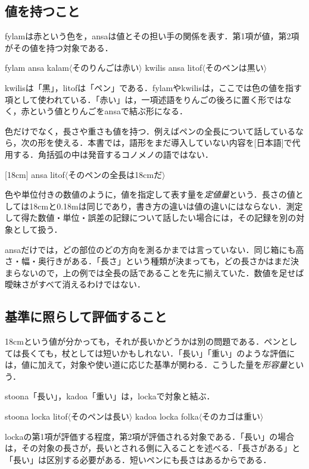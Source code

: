 \documentclass[b5paper, 10pt]{ltjsarticle}
\newcommand{\ko}[1]{\textsf{#1}}
\newcommand{\sentence}[1]{$\langle$#1$\rangle$}
\newcommand{\kox}[1]{\textsf{[#1]}}
\begin{document}
\subsection{値を持つこと}
\ko{fylam}は赤という色を，\ko{ansa}は値とその担い手の関係を表す．第1項が値，第2項がその値を持つ対象である．
\begin{exe}
    \ex \ko{fylam ansa kalam}\hfill \sentence{そのりんごは赤い}
    \ex \ko{kwilis ansa litof}\hfill \sentence{そのペンは黒い}
\end{exe}
\ko{kwilis}は「黒」，\ko{litof}は「ペン」である．\ko{fylam}や\ko{kwilis}は，ここでは色の値を指す項として使われている．「赤い」は，一項述語をりんごの後ろに置く形ではなく，赤という値とりんごを\ko{ansa}で結ぶ形になる．

色だけでなく，長さや重さも値を持つ．例えばペンの全長について話しているなら，次の形を使える．本書では，語形をまだ導入していない内容を\kox{日本語}で代用する．角括弧の中は発音するコノメノの語ではない．
\begin{exe}
    \ex \kox{18cm} \ko{ansa litof}\hfill \sentence{そのペンの全長は18cmだ}
\end{exe}
色や単位付きの数値のように，値を指定して表す量を\emph{定値量}という．長さの値としては18cmと0.18mは同じであり，書き方の違いは値の違いにはならない．測定して得た数値・単位・誤差の記録について話したい場合には，その記録を別の対象として扱う．

\ko{ansa}だけでは，どの部位のどの方向を測るかまでは言っていない．同じ箱にも高さ・幅・奥行きがある．「長さ」という種類が決まっても，どの長さかはまだ決まらないので，上の例では全長の話であることを先に揃えていた．数値を足せば曖昧さがすべて消えるわけではない．

\subsection{基準に照らして評価すること}
18cmという値が分かっても，それが長いかどうかは別の問題である．ペンとしては長くても，杖としては短いかもしれない．「長い」「重い」のような評価には，値に加えて，対象や使い道に応じた基準が関わる．こうした量を\emph{形容量}という．

\ko{stoona}「長い」，\ko{kadoa}「重い」は，\ko{locka}で対象と結ぶ．
\begin{exe}
    \ex \ko{stoona locka litof}\hfill \sentence{そのペンは長い}
    \ex \ko{kadoa locka folka}\hfill \sentence{そのカゴは重い}
\end{exe}
\ko{locka}の第1項が評価する程度，第2項が評価される対象である．「長い」の場合は，その対象の長さが，長いとされる側に入ることを述べる．「長さがある」と「長い」は区別する必要がある．短いペンにも長さはあるからである．
\end{document}
